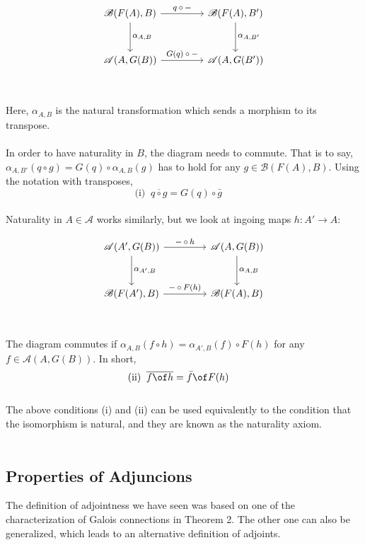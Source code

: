 	\[
	\begin{tikzcd}[ampersand replacement=\&, every label/.append style = {font = \footnotesize}, row sep = 7ex, column sep =10ex]
	\mathscr{B}(F(A), B) \arrow[r, "q \circ -"]  \arrow[d, "\alpha_{A, B}"]
	\&  \mathscr{B}(F(A), B')  \arrow[d, "\alpha_{A, B'}" ] \\
	\mathscr{A}(A, G(B)) \arrow[r,  "G(q) \circ -"]
	\& \mathscr{A}(A, G(B'))
	\end{tikzcd}
	\]\\\\
	Here, $\alpha_{A, B}$ is the natural transformation which sends a morphism to its transpose.\\\\
	In order to have naturality in $B$, the diagram needs to commute. That is to say, 
	$\alpha_{A, B'}(q \circ g) = G(q) \circ \alpha_{A, B}(g)$ has to hold for any $g \in \mathscr B(F(A), B)$. Using the notation 
	 with transposes, 
	\[\text{(i)}\;\;\overline{q \circ g} = G(q) \circ \bar{g} \;\;\;\;\]\\
	Naturality in $A \in \mathscr A$ works similarly, but we look at ingoing maps $h: A' \to A$: 
	
	\[
	\begin{tikzcd}[ampersand replacement=\&, every label/.append style = {font = \footnotesize},, row sep = 7ex,  column sep =10ex]
	\mathscr A(A', G(B)) \arrow[r, "- \circ h"]  \arrow[d, "\alpha_{A', B}"]
	\& \mathscr{A}(A, G(B))  \arrow[d, "\alpha_{A, B}" ] \\
	\mathscr B(F(A'), B) \arrow[r,  "- \circ F(h)"]
	\& \mathscr B(F(A), B)
	\end{tikzcd}
	\]\\\\
	The diagram commutes if $\alpha_{A, B}(f \circ h) = \alpha_{A', B}(f) \circ F(h)$
	for any $ f \in \mathscr A(A, G(B))$. In short,
	\[\text{(ii)}\;\;\overline{f \of h} = \bar{f} \of F(h) \;\;\;\;\]\\
	The above conditions (i) and (ii) can be used equivalently to the condition that the isomorphism is natural, and they are known as the naturality axiom.
	\\\\

	\subsection*{Properties of Adjuncions}
	The definition of adjointness we have seen was based on one of the characterization of Galois connections in Theorem 2. The other one can also be generalized, which leads to an alternative  definition of adjoints.
